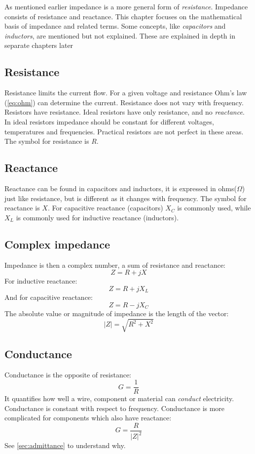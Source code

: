 As mentioned earlier impedance is a more general form of \emph{resistance}. 
Impedance consists of resistance and reactance. This chapter focuses on the mathematical basis of impedance and related terms. Some concepts, like 
\emph{capacitors} and \emph{inductors}, are mentioned but not explained. These 
are explained in depth in separate chapters later

\subsection{Resistance}
Resistance limits the current flow. For a given voltage and resistance Ohm's law 
(\vref{eq:ohm}) can determine the current. Resistance does not vary with 
frequency. Resistors have resistance. Ideal resistors have only resistance, and 
no \emph{reactance}. In ideal resistors impedance should be constant for 
different voltages, temperatures and frequencies. Practical resistors are not 
perfect in these areas. The symbol for resistance is \(R\).
\subsection{Reactance}
Reactance can be found in capacitors and inductors, it is expressed in 
ohms(\(\Omega\)) just like resistance, but is different as it changes with 
frequency. The symbol for reactance is \(X\). For capacitive reactance 
(capacitors) \(X_C\) is commonly used, while \(X_L\) is commonly used for 
inductive reactance (inductors).
\subsection{Complex impedance}
Impedance is then a complex number, a sum of resistance and reactance:
\begin{equation}\label{eq:impedance}
    Z = R + jX
\end{equation}
For inductive reactance:
\begin{equation}\label{eq:impedanceind}
    Z = R + jX_L
\end{equation}
And for capacitive reactance:
\begin{equation}\label{eq:impedancecap}
    Z = R - jX_C
\end{equation}
The absolute value or magnitude of impedance is the length of the vector:
\begin{equation}
    |Z| = \sqrt{R^2+X^2}
\end{equation}
\subsection{Conductance}\label{sec:conductance}
Conductance is the opposite of resistance:
\begin{equation}
    G = \frac{1}{R}
\end{equation}
It quantifies how well a wire, component or material can 
\emph{conduct} electricity. Conductance is constant with respect to frequency. 
Conductance is more complicated for components which also have reactance:
\begin{equation}
    G = \frac{R}{|Z|^2}
\end{equation}
See \vref{sec:admittance} to understand why.
